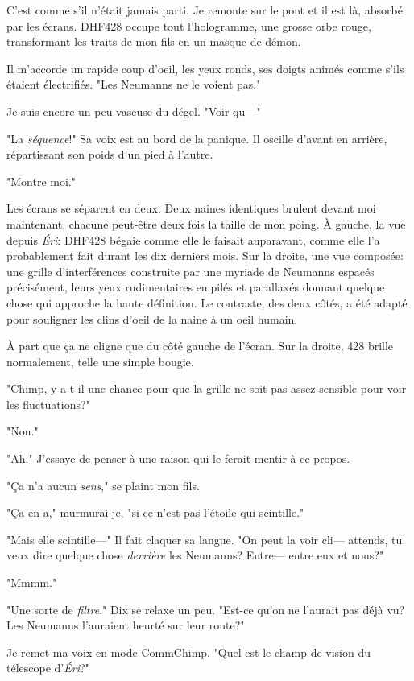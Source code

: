 C'est comme s'il n'était jamais parti. Je remonte sur le pont et il est là, absorbé par les écrans. DHF428 occupe tout l'hologramme, une grosse orbe rouge, transformant les traits de mon fils en un masque de démon.

Il m'accorde un rapide coup d'oeil, les yeux ronds, ses doigts ani\-més com\-me s'ils étaient électrifiés. "Les Neumanns ne le voient pas."

Je suis encore un peu vaseuse du dégel. "Voir qu—"

"La \emph{séquence}!" Sa voix est au bord de la panique. Il oscille d'avant en arrière, répartissant son poids d'un pied à l'autre.

"Montre moi."

Les écrans se séparent en deux. Deux naines identiques brulent de\-vant moi maintenant, chacune peut-être deux fois la taille de mon poing. À gauche, la vue depuis \emph{Éri}: DHF428 bégaie comme elle le faisait auparavant, comme elle l'a probablement fait durant les dix derniers mois. Sur la droite, une vue composée: une grille d'interférences construite par une myriade de Neumanns espacés précisément, leurs yeux rudimentaires empilés et parallaxés donnant quelque chose qui approche la haute définition. Le contraste, des deux côtés, a été adapté pour souligner les clins d'oeil de la naine à un oeil humain.

À part que ça ne cligne que du côté gauche de l'écran. Sur la droite, 428 brille normalement, telle une simple bougie.

"Chimp, y a-t-il une chance pour que la grille ne soit pas assez sensible pour voir les fluctuations?"

"Non."

"Ah." J'essaye de penser à une raison qui le ferait mentir à ce propos.

"Ça n'a aucun \emph{sens}," se plaint mon fils.

"Ça en a," murmurai-je, "si ce n'est pas l'étoile qui scintille."

"Mais elle scintille—" Il fait claquer sa langue. "On peut la voir cli— attends, tu veux dire quelque chose \emph{derrière} les Neumanns? Entre— entre eux et nous?"

"Mmmm."

"Une sorte de \emph{filtre}." Dix se relaxe un peu. "Est-ce qu'on ne l'aurait pas déjà vu? Les Neumanns l'auraient heurté sur leur route?"

Je remet ma voix en mode CommChimp. "Quel est le champ de vision du télescope d'\emph{Éri}?"

